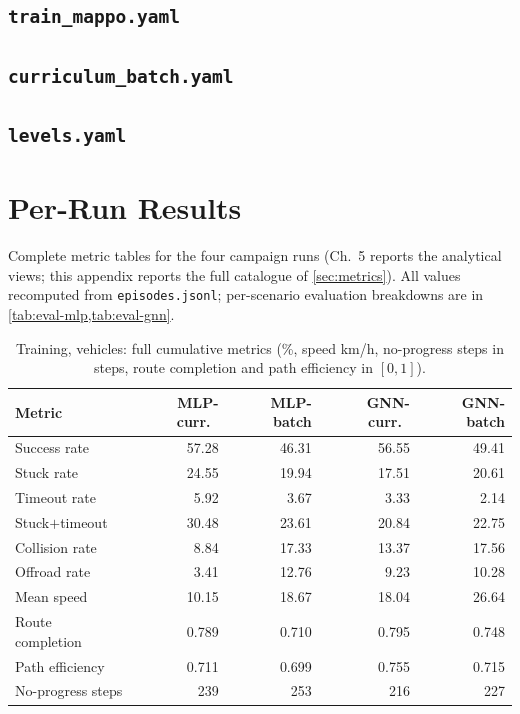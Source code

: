 \section*{\texttt{train\_mappo.yaml}}
{\scriptsize}

\section*{\texttt{curriculum\_batch.yaml}}
{\scriptsize}

\section*{\texttt{levels.yaml}}
{\scriptsize}

\chapter{Per-Run Results}
\label{app:per-seed}

Complete metric tables for the four campaign runs (Ch.~5 reports the
analytical views; this appendix reports the full catalogue of
\cref{sec:metrics}). All values recomputed from
\texttt{episodes.jsonl}; per-scenario evaluation breakdowns are in
\cref{tab:eval-mlp,tab:eval-gnn}.

\begin{table}[h]
  \centering\small
  \caption{Training, vehicles: full cumulative metrics (\%, speed km/h,
  no-progress steps in steps, route completion and path efficiency in
  $[0,1]$).}
  \begin{tabular}{@{}lrrrr@{}}
    \toprule
    Metric & MLP-curr.\ & MLP-batch & GNN-curr.\ & GNN-batch \\
    \midrule
    Success rate & 57.28 & 46.31 & 56.55 & 49.41 \\
    Stuck rate & 24.55 & 19.94 & 17.51 & 20.61 \\
    Timeout rate & 5.92 & 3.67 & 3.33 & 2.14 \\
    Stuck$+$timeout & 30.48 & 23.61 & 20.84 & 22.75 \\
    Collision rate & 8.84 & 17.33 & 13.37 & 17.56 \\
    Offroad rate & 3.41 & 12.76 & 9.23 & 10.28 \\
    Mean speed & 10.15 & 18.67 & 18.04 & 26.64 \\
    Route completion & 0.789 & 0.710 & 0.795 & 0.748 \\
    Path efficiency & 0.711 & 0.699 & 0.755 & 0.715 \\
    No-progress steps & 239 & 253 & 216 & 227 \\
    \bottomrule
  \end{tabular}
\end{table}

